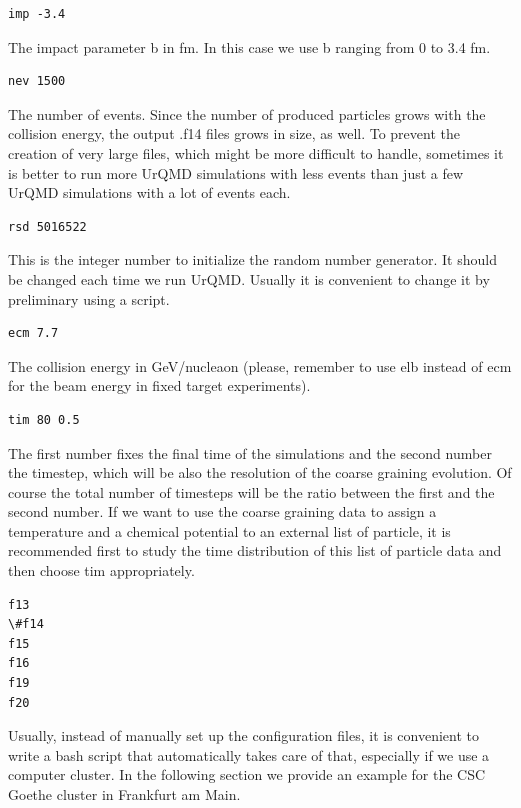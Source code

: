 \documentclass[12pt, a4paper]{article}
\begin{document}
\begin{verbatim}
imp -3.4
\end{verbatim}

The impact parameter b in fm. In this case we use b ranging from 0 to 3.4 fm.\\

\begin{verbatim}
nev 1500
\end{verbatim}
The number of events. Since the number of produced particles grows with the collision energy, the output .f14 files grows in size, as well. To prevent the creation of very large files, which might be more difficult to handle, sometimes it is better to run more UrQMD simulations with less events than just a few UrQMD simulations with a lot of events each.\\

\begin{verbatim}
rsd 5016522
\end{verbatim}
This is the integer number to initialize the random number generator. It should be changed each time we run UrQMD. Usually it is convenient to change it by preliminary using a script.\\

\begin{verbatim}
ecm 7.7
\end{verbatim}
The collision energy in GeV/nucleaon (please, remember to use elb instead of ecm for the beam energy in fixed target experiments).\\

\begin{verbatim}
tim 80 0.5
\end{verbatim}
The first number fixes the final time of the simulations and the second number the timestep, which will be also the resolution of the coarse graining evolution. Of course the total number of timesteps will be the ratio between the first and the second number.
If we want to use the coarse graining data to assign a temperature and a chemical potential to an external list of particle, it is recommended first to study the time distribution of this list of particle data and then choose tim appropriately.

\begin{verbatim}
f13
\#f14
f15
f16
f19
f20
\end{verbatim}
Usually, instead of manually set up the configuration files, it is convenient to write a bash script that automatically takes care of that, especially if we use a computer cluster.
In the following section we provide an example for the CSC Goethe cluster in Frankfurt am Main.



\end{document}
